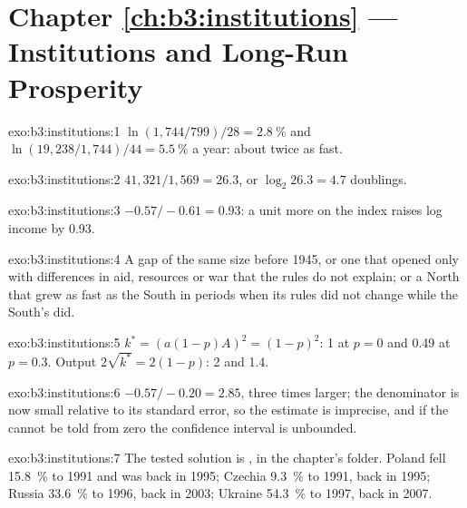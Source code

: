 \section*{Chapter \ref{ch:b3:institutions} --- Institutions and Long-Run Prosperity}

\begin{solution}{exo:b3:institutions:1}
$\ln(1{,}744/799)/28 = 2.8~\%$ and $\ln(19{,}238/1{,}744)/44 = 5.5~\%$ a year: about twice as fast. %
\end{solution}

\begin{solution}{exo:b3:institutions:2}
$41{,}321/1{,}569 = 26.3$, or $\log_2 26.3 = 4.7$ doublings.
\end{solution}

\begin{solution}{exo:b3:institutions:3}
$-0.57/-0.61 = 0.93$: a unit more on the index raises log income by 0.93.
\end{solution}

\begin{solution}{exo:b3:institutions:4}
A gap of the same size before 1945, or one that opened only with differences in aid,
resources or war that the rules do not explain; or a North that grew as fast as the
South in periods when its rules did not change while the South's did.
\end{solution}

\begin{solution}{exo:b3:institutions:5}
$k^* = (a(1 - p)A)^2 = (1 - p)^2$: 1 at $p = 0$ and 0.49 at $p = 0.3$. Output $2\sqrt{k^*} = 2(1 - p)$: 2 and 1.4.
\end{solution}

\begin{solution}{exo:b3:institutions:6}
$-0.57/-0.20 = 2.85$, three times larger; the denominator is now small relative to its
standard error, so the estimate is imprecise, and if the  cannot be told
from zero the confidence interval is unbounded.
\end{solution}

\begin{solution}{exo:b3:institutions:7}
The tested solution is , in the chapter's 
folder. Poland fell 15.8~\% to 1991 and was back in 1995; Czechia 9.3~\% to 1991, back in 1995; Russia 33.6~\% to
1996, back in 2003; Ukraine 54.3~\% to 1997, back in 2007. %
\end{solution}

